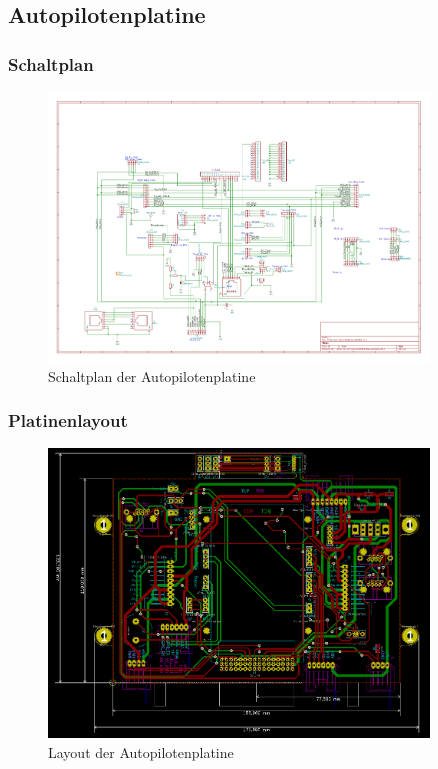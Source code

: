 \subsection{Autopilotenplatine}

\subsubsection{Schaltplan}

\begin{figure}[H]
\centering
\includegraphics[width=0.9\textwidth]{bilder/Centerbox/Centerbox-Rear-Pixhawk_AUVSI16.pdf} 
\caption{Schaltplan der Autopilotenplatine} 
\label{fig:Schaltplan der Autopilotenplatine}
\end{figure}

\subsubsection{Platinenlayout}

\begin{figure}[H]
\centering
\includegraphics[width=0.9\textwidth]{bilder/Centerbox/Centerbox-Rear-Pixhawk_AUVSI_2016_rev-01-layout.png} 
\caption{Layout der Autopilotenplatine} 
\label{fig:Layout der Autopilotenplatine}
\end{figure}


